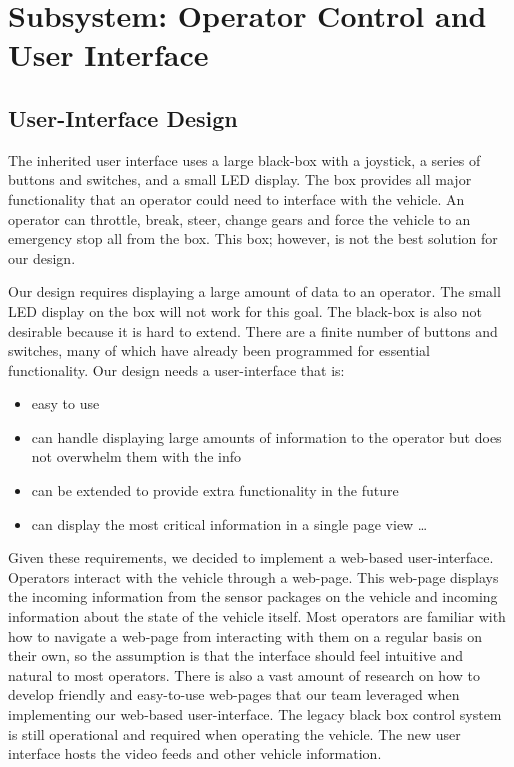 \chapter{Subsystem: Operator Control and User Interface} \label{ch:ui}

\section{User-Interface Design} The inherited user interface uses a large black-box with a joystick, a series of buttons and switches, and a small LED display.  The box provides all major functionality that an operator could need to interface with the vehicle.  An operator can throttle, break, steer, change gears and force the vehicle to an emergency stop all from the box.  This box; however, is not the best solution for our design.

Our design requires displaying a large amount of data to an operator.  The small LED display on the box will not work for this goal.  The black-box is also not desirable because it is hard to extend.  There are a finite number of buttons and switches, many of which have already been programmed for essential functionality.  Our design needs a user-interface that is:
\begin{itemize}
	\item easy to use
    \item can handle displaying large amounts of information to the operator but does not overwhelm them with the info
    \item can be extended to provide extra functionality in the future 
    \item can display the most critical information in a single page view
    \ldots
\end{itemize}
  
Given these requirements, we decided to implement a web-based user-interface.  Operators interact with the vehicle through a web-page.  This web-page displays the incoming information from the sensor packages on the vehicle and incoming information about the state of the vehicle itself.  Most operators are familiar with how to navigate a web-page from interacting with them on a regular basis on their own, so the assumption is that the interface should feel intuitive and natural to most operators.  There is also a vast amount of research on how to develop friendly and easy-to-use web-pages that our team leveraged when implementing our web-based user-interface. The legacy black box control system is still operational and required when operating the vehicle. The new user interface hosts the video feeds and other vehicle information.

